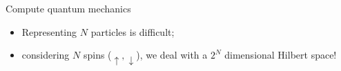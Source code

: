 \documentclass[aspectratio=169, 10pt, xcolor={svgnames}, hyperref={linkcolor=black}]{beamer}
\begin{document}
\begin{frame}{Compute quantum mechanics}
  \pause
  \begin{itemize}[noitemsep]
  \item<2,3>[\faGear] Representing $N$ particles is difficult;
  \item<3>[\faGears] considering $N$ spins ($\uparrow, \downarrow$), we deal with a $2^N$ dimensional Hilbert space!
  \end{itemize}
  \begin{multicols}{2}
    \begin{figure}
    \end{figure}
    \begin{figure}
    \end{figure}
\end{multicols}
\end{frame}
\end{document}
